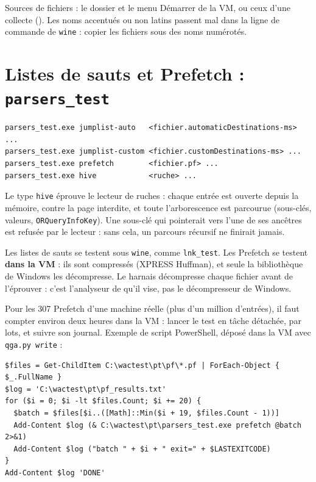 \documentclass[11pt,a4paper,oneside]{report}
\begin{document}
Sources de fichiers : le dossier  et le menu Démarrer de la VM,
ou ceux d'une collecte (). Les noms accentués ou
non latins passent mal dans la ligne de commande de \texttt{wine} : copier les
fichiers sous des noms numérotés.

\section{Listes de sauts et Prefetch : \texttt{parsers\_test}}\label{sec:parsers}

\begin{lstlisting}
parsers_test.exe jumplist-auto   <fichier.automaticDestinations-ms> ...
parsers_test.exe jumplist-custom <fichier.customDestinations-ms> ...
parsers_test.exe prefetch        <fichier.pf> ...
parsers_test.exe hive            <ruche> ...
\end{lstlisting}

Le type \texttt{hive} éprouve le lecteur de ruches : chaque entrée est ouverte
depuis la mémoire, contre la page interdite, et toute l'arborescence est
parcourue (sous-clés, valeurs, \texttt{ORQueryInfoKey}). Une sous-clé qui
pointerait vers l'une de ses ancêtres est refusée par le lecteur : sans cela,
un parcours récursif ne finirait jamais.

Les listes de sauts se testent sous \texttt{wine}, comme \texttt{lnk\_test}. Les
Prefetch se testent \textbf{dans la VM} : ils sont compressés (XPRESS Huffman),
et seule la bibliothèque  de Windows les décompresse. Le harnais
décompresse chaque fichier avant de l'éprouver : c'est l'analyseur de \wac{}
qu'il vise, pas le décompresseur de Windows.

Pour les 307 Prefetch d'une machine réelle (plus d'un million d'entrées), il
faut compter environ deux heures dans la VM : lancer le test en tâche détachée,
par lots, et suivre son journal. Exemple de script PowerShell, déposé dans la VM
avec \texttt{qga.py write} :

\begin{lstlisting}
$files = Get-ChildItem C:\wactest\pt\pf\*.pf | ForEach-Object { $_.FullName }
$log = 'C:\wactest\pt\pf_results.txt'
for ($i = 0; $i -lt $files.Count; $i += 20) {
  $batch = $files[$i..([Math]::Min($i + 19, $files.Count - 1))]
  Add-Content $log (& C:\wactest\pt\parsers_test.exe prefetch @batch 2>&1)
  Add-Content $log ("batch " + $i + " exit=" + $LASTEXITCODE)
}
Add-Content $log 'DONE'
\end{lstlisting}
\end{document}
